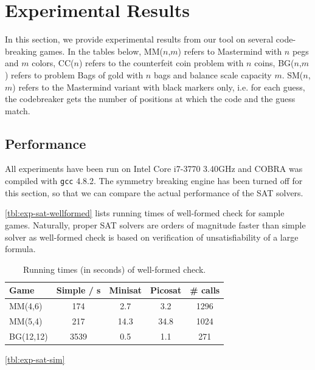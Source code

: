 \chapter{Experimental Results}

In this section, we provide experimental results from our tool
on several code-breaking games.
In the tables below, MM($n$,$m$) refers to Mastermind with $n$ pegs and $m$ colors,
CC($n$) refers to the counterfeit coin problem with $n$ coins,
BG($n$,$m$) refers to problem Bags of gold with $n$ bags and balance scale capacity $m$.
SM($n$,$m$) refers to the Mastermind variant with black markers only, i.e.
  for each guess, the codebreaker gets the number of positions at which the code
  and the guess match.

\section{Performance}

All experiments have been run on Intel Core i7-3770 3.40GHz and COBRA was
compiled with \texttt{gcc} 4.8.2.
The symmetry breaking engine has been turned off for this section,
  so that we can compare the actual performance of the SAT solvers.

\autoref{tbl:exp-sat-wellformed} lists running times of well-formed check for sample games.
Naturally, proper SAT solvers are orders of magnitude faster than simple solver
as well-formed check is based on verification of unsatisfiability of a large formula.

\begin{table}[h]
\begin{center}
\begin{tabular}{|l|c|c|c|c|} \hline
Game & Simple / s & Minisat & Picosat  & \# calls \\ \hline
MM(4,6) & 174 & 2.7 & 3.2 & 1296 \\
MM(5,4) & 217 & 14.3 & 34.8 & 1024 \\
BG(12,12) & 3539 &  0.5 & 1.1 & 271 \\\hline
\end{tabular}
\caption{Running times (in seconds) of well-formed check.}
\label{tbl:exp-sat-wellformed}
\end{center}
\end{table}

\autoref{tbl:exp-sat-sim} 


